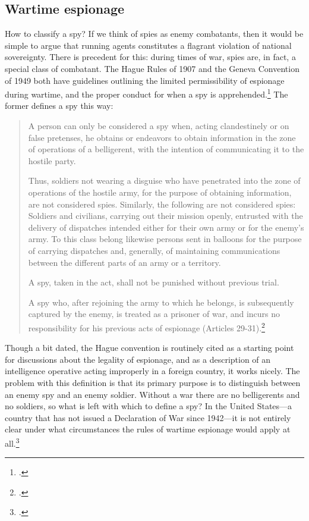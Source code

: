 \documentclass[12pt]{article}
\begin{document}
\subsection{Wartime espionage}
How to classify a spy? If we think of spies as enemy combatants, then it would be simple to argue that running agents constitutes a flagrant violation of national sovereignty. There is precedent for this: during times of war, spies are, in fact, a special class of combatant. The Hague Rules of 1907 and the Geneva Convention of 1949 both have guidelines outlining the limited permissibility of espionage during wartime, and the proper conduct for when a spy is apprehended.\footcite[p.~652]{beim_enforcing_2018} The former defines a spy this way:

\begin{quote}
A person can only be considered a spy when, acting clandestinely or on false pretenses, he obtains or endeavors to obtain information in the zone of operations of a belligerent, with the intention of communicating it to the hostile party.

Thus, soldiers not wearing a disguise who have penetrated into the zone of operations of the hostile army, for the purpose of obtaining information, are not considered spies. Similarly, the following are not considered spies: Soldiers and civilians, carrying out their mission openly, entrusted with the delivery of dispatches intended either for their own army or for the enemy's army. To this class belong likewise persons sent in balloons for the purpose of carrying dispatches and, generally, of maintaining communications between the different parts of an army or a territory.

A spy, taken in the act, shall not be punished without previous trial.

A spy who, after rejoining the army to which he belongs, is subsequently captured by the enemy, is treated as a prisoner of war, and incurs no responsibility for his previous acts of espionage (Articles 29-31).\footcite{noauthor_hague_1907}
\end{quote}

Though a bit dated, the Hague convention is routinely cited as a starting point for discussions about the legality of espionage, and as a description of an intelligence operative acting improperly in a foreign country, it works nicely. The problem with this definition is that its primary purpose is to distinguish between an enemy spy and an enemy soldier. Without a war there are no belligerents and no soldiers, so what is left with which to define a spy? In the United States---a country that has not issued a Declaration of War since 1942---it is not entirely clear under what circumstances the rules of wartime espionage would apply at all.\footcite{ncc_staff_when_2018}
\end{document}
